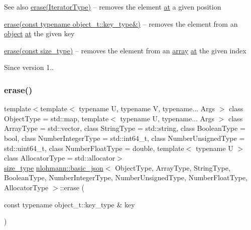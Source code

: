 \begin{DoxySeeAlso}{See also}
\hyperlink{classnlohmann_1_1basic__json_ab9f8c9a02d6bb794ee26801a232ca4f4}{erase(\+Iterator\+Type)} -- removes the element \hyperlink{classnlohmann_1_1basic__json_a214a8c22d616fd3567b88932c07436c9}{at} a given position 

\hyperlink{classnlohmann_1_1basic__json_aa36e72ffc3241b960fe9186d19e03bc3}{erase(const typename object\+\_\+t\+::key\+\_\+type\&)} -- removes the element from an \hyperlink{classnlohmann_1_1basic__json_ad25b2f8c21e241e2d63455537a9294ff}{object} \hyperlink{classnlohmann_1_1basic__json_a214a8c22d616fd3567b88932c07436c9}{at} the given key 

\hyperlink{classnlohmann_1_1basic__json_a3da254c422ede5495f2815c5e48c00c5}{erase(const size\+\_\+type)} -- removes the element from an \hyperlink{classnlohmann_1_1basic__json_a5685815624b086caa532f41e853d4b0f}{array} \hyperlink{classnlohmann_1_1basic__json_a214a8c22d616fd3567b88932c07436c9}{at} the given index
\end{DoxySeeAlso}
\begin{DoxySince}{Since}
version 1.. 
\end{DoxySince}
\hypertarget{classnlohmann_1_1basic__json_aa36e72ffc3241b960fe9186d19e03bc3}{}\label{classnlohmann_1_1basic__json_aa36e72ffc3241b960fe9186d19e03bc3} 
\subsubsection{\texorpdfstring{erase()}{erase()}\hspace{0.1cm}{\footnotesize\ttfamily [3/4]}}
{\footnotesize\ttfamily template$<$template$<$ typename U, typename V, typename... Args $>$ class Object\+Type = std\+::map, template$<$ typename U, typename... Args $>$ class Array\+Type = std\+::vector, class String\+Type  = std\+::string, class Boolean\+Type  = bool, class Number\+Integer\+Type  = std\+::int64\+\_\+t, class Number\+Unsigned\+Type  = std\+::uint64\+\_\+t, class Number\+Float\+Type  = double, template$<$ typename U $>$ class Allocator\+Type = std\+::allocator$>$ \\
\hyperlink{classnlohmann_1_1basic__json_a1579a8f72a230358d6cd1a6e8a62859b}{size\+\_\+type} \hyperlink{classnlohmann_1_1basic__json}{nlohmann\+::basic\+\_\+json}$<$ Object\+Type, Array\+Type, String\+Type, Boolean\+Type, Number\+Integer\+Type, Number\+Unsigned\+Type, Number\+Float\+Type, Allocator\+Type $>$\+::erase (\begin{DoxyParamCaption}\item[{const typename object\+\_\+t\+::key\+\_\+type \&}]{key }\end{DoxyParamCaption})\hspace{0.3cm}{\ttfamily [inline]}}



